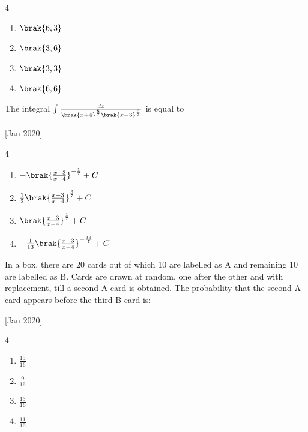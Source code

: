         \begin{multicols}{4}
            \begin{enumerate}
                \item $\brak{6, 3}$
                \item $\brak{3, 6}$
                \item $\brak{3, 3}$
                \item $\brak{6, 6}$
            \end{enumerate}
        \end{multicols}

    \item The integral $\int\frac{dx}{\brak{x+4}^{\frac{8}{7}}\brak{x-3}^{\frac{6}{7}}}$ is equal to
    
    \hfill{[Jan 2020]}

		\begin{multicols}{4}
			\begin{enumerate}
				\item $-\brak{\frac{x-3}{x-4}}^{-\frac{1}{7}}+C$
				\item $\frac{1}{2}\brak{\frac{x-3}{x-4}}^{\frac{3}{7}}+C$
				\item $\brak{\frac{x-3}{x-4}}^{\frac{1}{7}}+C$
				\item $-\frac{1}{13}\brak{\frac{x-3}{x-4}}^{-\frac{13}{7}}+C$
			\end{enumerate}
		\end{multicols}

    \item In a box, there are 20 cards out of which 10 are labelled as A and remaining 10 are labelled as B. Cards are drawn at random, one after the other and with replacement, till a second A-card is obtained. The probability that the second A-card appears before the third B-card is:
    
    \hfill{[Jan 2020]}

		\begin{multicols}{4}
			\begin{enumerate}
				\item $\frac{15}{16}$
				\item $\frac{9}{16}$
				\item $\frac{13}{16}$
				\item $\frac{11}{16}$
			\end{enumerate}
		\end{multicols}
